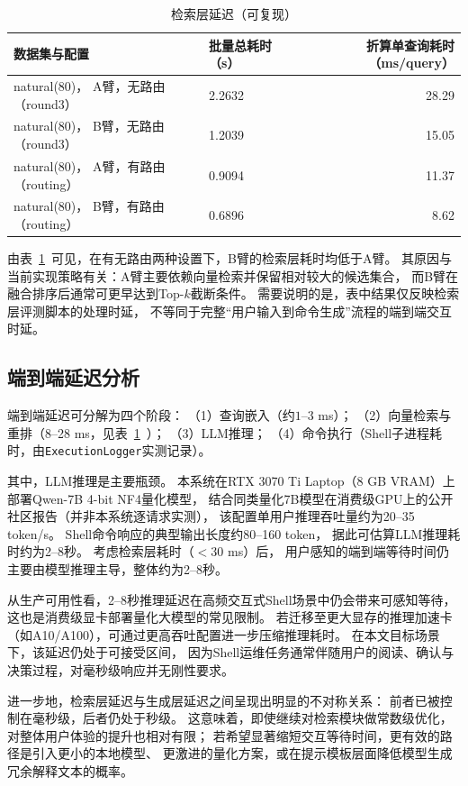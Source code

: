 \begin{table}[htbp]
\centering
\caption{检索层延迟（可复现）}
\label{tab:latency}
\begin{tabular}{llr}
\toprule
数据集与配置 & 批量总耗时（s） & 折算单查询耗时（ms/query）\\
\midrule
natural(80)， A臂，无路由（round3） & 2.2632 & 28.29 \\
natural(80)， B臂，无路由（round3） & 1.2039 & 15.05 \\
natural(80)， A臂，有路由（routing） & 0.9094 & 11.37 \\
natural(80)， B臂，有路由（routing） & 0.6896 & 8.62 \\
\bottomrule
\end{tabular}
\end{table}

由表~\ref{tab:latency}~可见，在有无路由两种设置下，B臂的检索层耗时均低于A臂。
其原因与当前实现策略有关：A臂主要依赖向量检索并保留相对较大的候选集合，
而B臂在融合排序后通常可更早达到Top-$k$截断条件。
需要说明的是，表中结果仅反映检索层评测脚本的处理时延，
不等同于完整“用户输入到命令生成”流程的端到端交互时延。

\subsection{端到端延迟分析}

端到端延迟可分解为四个阶段：
（1）查询嵌入（约$1$–$3$ ms）；
（2）向量检索与重排（8–28 ms，见表~\ref{tab:latency}~）；
（3）LLM推理；
（4）命令执行（Shell子进程耗时，由\texttt{ExecutionLogger}实测记录）。

其中，LLM推理是主要瓶颈。
本系统在RTX 3070 Ti Laptop（8 GB VRAM）上部署Qwen-7B 4-bit NF4量化模型，
结合同类量化7B模型在消费级GPU上的公开社区报告（并非本系统逐请求实测），
该配置单用户推理吞吐量约为20–35 token/s。
Shell命令响应的典型输出长度约80–160 token，
据此可估算LLM推理耗时约为2–8秒。
考虑检索层耗时（$<30$ ms）后，
用户感知的端到端等待时间仍主要由模型推理主导，整体约为2–8秒。

从生产可用性看，2–8秒推理延迟在高频交互式Shell场景中仍会带来可感知等待，
这也是消费级显卡部署量化大模型的常见限制。
若迁移至更大显存的推理加速卡（如A10/A100），可通过更高吞吐配置进一步压缩推理耗时。
在本文目标场景下，该延迟仍处于可接受区间，
因为Shell运维任务通常伴随用户的阅读、确认与决策过程，对毫秒级响应并无刚性要求。

进一步地，检索层延迟与生成层延迟之间呈现出明显的不对称关系：
前者已被控制在毫秒级，后者仍处于秒级。
这意味着，即使继续对检索模块做常数级优化，
对整体用户体验的提升也相对有限；
若希望显著缩短交互等待时间，更有效的路径是引入更小的本地模型、
更激进的量化方案，或在提示模板层面降低模型生成冗余解释文本的概率。

